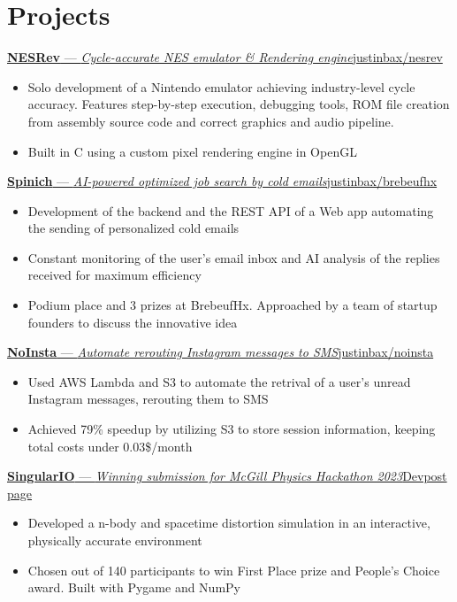 \documentclass{article}
\newcommand{\shortlinkrole}[4]{
    {\href{#3}{\normalfont\textbf{#1} --- \textit{#2}\hfill#4\:\faExternalLink}\vspace*{-4pt}}
}
\newenvironment{bulletpoints}{\begin{itemize}\setlength\itemsep{-0.2em}}{\end{itemize}}
\begin{document}
\section*{Projects}

\shortlinkrole{NESRev}{Cycle-accurate NES emulator \& Rendering engine}{https://github.com/justinbax/nesrev}{justinbax/nesrev}
\begin{bulletpoints}
    \item Solo development of a Nintendo emulator achieving industry-level cycle accuracy. Features step-by-step execution, debugging tools, ROM file creation from assembly source code and correct graphics and audio pipeline.
    \item Built in C using a custom pixel rendering engine in OpenGL
\end{bulletpoints}

\shortlinkrole{Spinich}{AI-powered optimized job search by cold emails}{https://github.com/justinbax/brebeufhx}{justinbax/brebeufhx}
\begin{bulletpoints}
    \item Development of the backend and the REST API of a Web app automating the sending of personalized cold emails
    \item Constant monitoring of the user's email inbox and AI analysis of the replies received for maximum efficiency
    \item Podium place and 3 prizes at BrebeufHx. Approached by a team of startup founders to discuss the innovative idea
\end{bulletpoints}

\shortlinkrole{NoInsta}{Automate rerouting Instagram messages to SMS}{https://github.com/justinbax/brebeufhx}{justinbax/noinsta}
\begin{bulletpoints}
    \item Used AWS Lambda and S3 to automate the retrival of a user's unread Instagram messages, rerouting them to SMS
    \item Achieved 79\% speedup by utilizing S3 to store session information, keeping total costs under 0.03\$/month
\end{bulletpoints}

\shortlinkrole{SingularIO}{Winning submission for McGill Physics Hackathon 2023}{https://devpost.com/software/singulario}{Devpost page}
\begin{bulletpoints}
    \item Developed a n-body and spacetime distortion simulation in an interactive, physically accurate environment
    \item Chosen out of 140 participants to win First Place prize and People's Choice award. Built with Pygame and NumPy
\end{bulletpoints}
\end{document}
